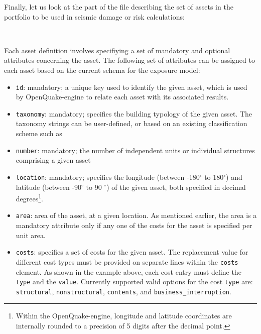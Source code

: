 Finally, let us look at the part of the file describing the set of assets in
the portfolio to be used in seismic damage or risk calculations:

\inputminted[firstline=17,firstnumber=17,lastline=27,fontsize=\footnotesize,frame=single,linenos,bgcolor=lightgray]{xml}{oqum/risk/Verbatim/input_exposure_minimal.xml}\\

Each asset definition involves specifiying a set of mandatory and optional
attributes concerning the asset. The following set of attributes can be
assigned to each asset based on the current schema for the exposure model:

\begin{itemize}

    \item \Verb+id+: mandatory; a unique key used to identify the given
    \gls{asset}, which is used by OpenQuake-engine to relate each asset 
    with its associated results.

    \item \Verb+taxonomy+: mandatory; specifies the building typology of the 
    given \gls{asset}. The taxonomy strings can be user-defined, or based on
    an existing classification scheme such as 

    \item \Verb+number+: mandatory; the number of independent units or 
    individual structures comprising a given \gls{asset}

    \item \Verb+location+: mandatory; specifies the longitude 
    (between -180$^{\circ}$ to 180$^{\circ}$) and latitude 
    (between -90$^{\circ}$ to 90 $^{\circ}$) of the given \gls{asset}, both
    specified in decimal degrees\footnote{Within the OpenQuake-engine, 
    longitude and latitude coordinates are internally rounded to a precision
    of 5 digits after the decimal point.}.

    \item \Verb+area+: area of the \gls{asset}, at a given location. As 
    mentioned earlier, the area is a mandatory attribute only if any one of the 
    costs for the \gls{asset} is specified per unit area.

    \item \Verb+costs+: specifies a set of costs for the given \gls{asset}. 
    The replacement value for different cost types must be provided on 
    separate lines within the \Verb+costs+ element. As shown in the example 
    above, each cost entry must define the \Verb+type+ and the \Verb+value+. 
    Currently supported valid options for the cost \Verb+type+ are: 
    \Verb+structural+,  \Verb+nonstructural+, \Verb+contents+, and 
    \Verb+business_interruption+.


\end{itemize}
